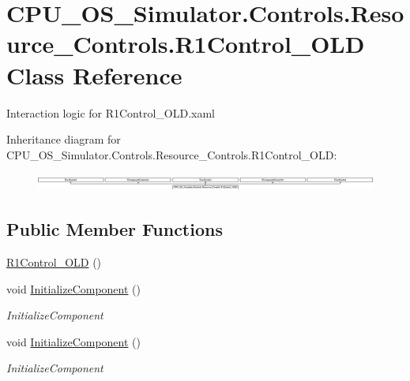 \hypertarget{class_c_p_u___o_s___simulator_1_1_controls_1_1_resource___controls_1_1_r1_control___o_l_d}{}\section{C\+P\+U\+\_\+\+O\+S\+\_\+\+Simulator.\+Controls.\+Resource\+\_\+\+Controls.\+R1\+Control\+\_\+\+O\+L\+D Class Reference}
\label{class_c_p_u___o_s___simulator_1_1_controls_1_1_resource___controls_1_1_r1_control___o_l_d}


Interaction logic for R1\+Control\+\_\+\+O\+L\+D.\+xaml  


Inheritance diagram for C\+P\+U\+\_\+\+O\+S\+\_\+\+Simulator.\+Controls.\+Resource\+\_\+\+Controls.\+R1\+Control\+\_\+\+O\+L\+D\+:\begin{figure}[H]
\begin{center}
\leavevmode
\includegraphics[height=0.581818cm]{class_c_p_u___o_s___simulator_1_1_controls_1_1_resource___controls_1_1_r1_control___o_l_d}
\end{center}
\end{figure}
\subsection*{Public Member Functions}
\begin{DoxyCompactItemize}
\item 
\hyperlink{class_c_p_u___o_s___simulator_1_1_controls_1_1_resource___controls_1_1_r1_control___o_l_d_abd1019d745109e3f16deb2d13b426da0}{R1\+Control\+\_\+\+O\+L\+D} ()
\item 
void \hyperlink{class_c_p_u___o_s___simulator_1_1_controls_1_1_resource___controls_1_1_r1_control___o_l_d_adf7bf2b6ef76c897b3a90c7dad90d083}{Initialize\+Component} ()
\begin{DoxyCompactList}\small\item\em Initialize\+Component \end{DoxyCompactList}\item 
void \hyperlink{class_c_p_u___o_s___simulator_1_1_controls_1_1_resource___controls_1_1_r1_control___o_l_d_adf7bf2b6ef76c897b3a90c7dad90d083}{Initialize\+Component} ()
\begin{DoxyCompactList}\small\item\em Initialize\+Component \end{DoxyCompactList}\end{DoxyCompactItemize}
